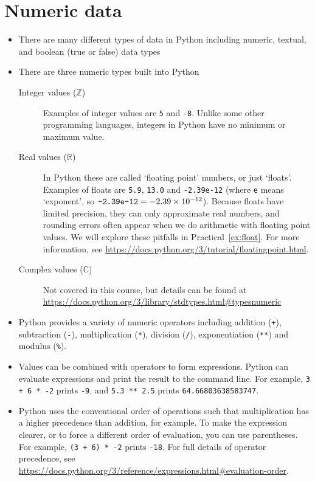 \documentclass[a4paper,twoside,titlepage]{memoir}
\newcommand{\shellcmd}{\texttt}
\begin{document}
\section{Numeric data}
\begin{itemize}
\item There are many different types of data in Python including numeric, textual, and boolean (true or false) data types
\item There are three numeric types built into Python
	\begin{description}
	\item[Integer values ($\mathbb{Z}$)]{Examples of integer values are \shellcmd{5} and \shellcmd{-8}.  Unlike some other programming languages, integers in Python have no minimum or maximum value.}
	\item[Real values ($\mathbb{R}$)]{In Python these are called `floating point' numbers, or just `floats'.  Examples of floats are \shellcmd{5.9}, \shellcmd{13.0} and \shellcmd{-2.39e-12} (where \shellcmd{e} means `exponent', so $\text{\shellcmd{-2.39e-12}} = \num{-2.39e-12}$).  Because floats have limited precision, they can only approximate real numbers, and rounding errors often appear when we do arithmetic with floating point values.  We will explore these pitfalls in Practical~\ref{ex:float}.  For more information, see \url{https://docs.python.org/3/tutorial/floatingpoint.html}.}
	\item[Complex values ($\mathbb{C}$)]{Not covered in this course, but details can be found at \url{https://docs.python.org/3/library/stdtypes.html#typesnumeric}}
	\end{description}
\item Python provides a variety of numeric operators including addition (\shellcmd{+}), subtraction (\shellcmd{-}), multiplication (\shellcmd{*}), division (\shellcmd{/}), exponentiation (\shellcmd{**}) and modulus (\shellcmd{\%}).
\item Values can be combined with operators to form expressions.  Python can evaluate expressions and print the result to the command line.  For example, \shellcmd{3 + 6 * -2} prints \shellcmd{-9}, and \shellcmd{5.3 ** 2.5} prints \shellcmd{64.66803638583747}.
\item Python uses the conventional order of operations such that multiplication has a higher precedence than addition, for example.  To make the expression clearer, or to force a different order of evaluation, you can use parentheses.  For example, \shellcmd{(3 + 6) * -2} prints \shellcmd{-18}.  For full details of operator precedence, see \url{https://docs.python.org/3/reference/expressions.html#evaluation-order}.
\end{itemize}
\end{document}
